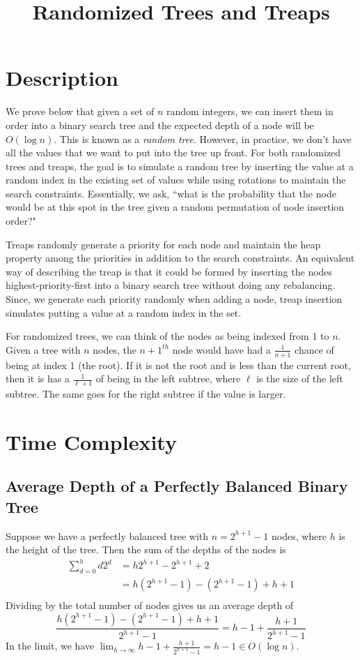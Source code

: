 \documentclass[12pt]{article}
\begin{document}
\title{Randomized Trees and Treaps}
\author{}
\maketitle


\section*{Description}
We prove below that given a set of $n$ random integers, we can insert them in order into a binary search tree and the expected depth of a node will be $O(\log n)$. This is known as a \emph{random tree}. However, in practice, we don't have all the values that we want to put into the tree up front. For both randomized trees and treaps, the goal is to simulate a random tree by inserting the value at a random index in the existing set of values while using rotations to maintain the search constraints. Essentially, we ask, ``what is the probability that the node would be at this spot in the tree given a random permutation of node insertion order?"

Treaps randomly generate a priority for each node and maintain the heap property among the priorities in addition to the search constraints. An equivalent way of describing the treap is that it could be formed by inserting the nodes highest-priority-first into a binary search tree without doing any rebalancing. Since, we generate each priority randomly when adding a node, treap insertion simulates putting a value at a random index in the set.

For randomized trees, we can think of the nodes as being indexed from 1 to $n$. Given a tree with $n$ nodes, the $n+1^{th}$ node would have had a $\frac{1}{n+1}$ chance of being at index 1 (the root). If it is not the root and is less than the current root, then it is has a $\frac{1}{\ell+1}$ of being in the left subtree, where $\ell$ is the size of the left subtree. The same goes for the right subtree if the value is larger.


\section*{Time Complexity}

\subsection*{Average Depth of a Perfectly Balanced Binary Tree}
Suppose we have a perfectly balanced tree with $n = 2^{h+1} - 1$ nodes, where $h$ is the height of the tree. Then the sum of the depths of the nodes is
\begin{align*}
  \sum_{d=0}^h d 2^d &= h 2^{h+1} - 2^{h+1} + 2 \\
  &= h(2^{h+1} - 1) - (2^{h+1} - 1) + h + 1 \\
\end{align*}
Dividing by the total number of nodes gives us an average depth of
\[ \frac{h(2^{h+1} - 1) - (2^{h+1} - 1) + h + 1}{2^{h+1} - 1} = h - 1 + \frac{h+1}{2^{h+1} - 1} \]
In the limit, we have $\lim_{h \rightarrow \infty} h - 1 + \frac{h+1}{2^{h+1} - 1} = h - 1 \in O(\log n)$.
\end{document}

